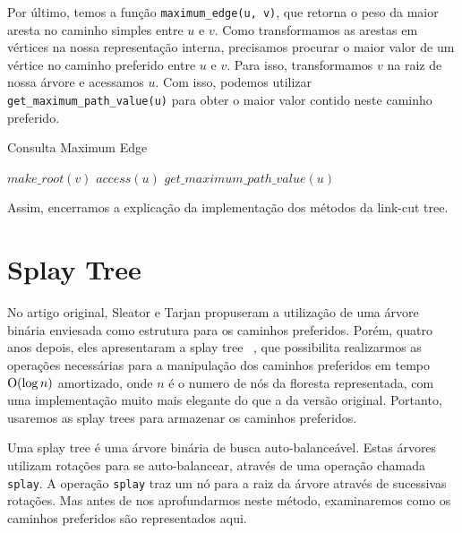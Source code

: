 Por último, temos a função \texttt{maximum\_edge(u, v)}, que retorna o peso da maior aresta no caminho simples entre $u$ e $v$. Como transformamos as arestas em vértices na nossa representação interna, precisamos procurar o maior valor de um vértice no caminho preferido entre $u$ e $v$. Para isso, transformamos $v$ na raiz de nossa árvore e acessamos $u$. Com isso, podemos utilizar \texttt{get\_maximum\_path\_value(u)} para obter o maior valor contido neste caminho preferido.

\begin{algorithm}[h!]
    \caption{Consulta Maximum Edge}\label{lct:max-edge}
    \begin{algorithmic}
        \State $make\_root(v)$
        \State $access(u)$
        \State \Return $get\_maximum\_path\_value(u)$
        \EndFunction
    \end{algorithmic}
\end{algorithm}

Assim, encerramos a explicação da implementação dos métodos da link-cut tree.

\section{Splay Tree}
\label{sec:lct-splay-trees}

No artigo original, Sleator e Tarjan propuseram a utilização de uma árvore binária enviesada como estrutura para os caminhos preferidos. Porém, quatro anos depois, eles apresentaram a splay tree ~\citep{10.1145/3828.3835}, que possibilita realizarmos as operações necessárias para a manipulação dos caminhos preferidos em tempo $\mathrm{O}(\log n)$ amortizado, onde $n$ é o numero de nós da floresta representada, com uma implementação muito mais elegante do que a da versão original. Portanto, usaremos as splay trees para armazenar os caminhos preferidos.

Uma splay tree é uma árvore binária de busca auto-balanceável. Estas árvores utilizam rotações para se auto-balancear, através de uma operação chamada \texttt{splay}. A operação \texttt{splay} traz um nó para a raiz da árvore através de sucessivas rotações. Mas antes de nos aprofundarmos neste método, examinaremos como os caminhos preferidos são representados aqui.

